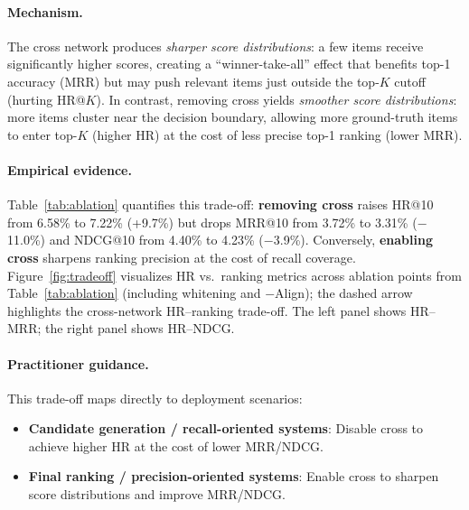 \documentclass[sigconf,natbib=true,anonymous]{acmart}
\begin{document}
\paragraph{Mechanism.}
The cross network produces \emph{sharper score distributions}:
a few items receive significantly higher scores, creating a
``winner-take-all'' effect that benefits top-1 accuracy (MRR)
but may push relevant items just outside the top-$K$ cutoff (hurting HR@$K$).
In contrast, removing cross yields \emph{smoother score distributions}:
more items cluster near the decision boundary,
allowing more ground-truth items to enter top-$K$ (higher HR)
at the cost of less precise top-1 ranking (lower MRR).

\paragraph{Empirical evidence.}
Table~\ref{tab:ablation} quantifies this trade-off:
\textbf{removing cross} raises HR@10 from 6.58\% to 7.22\% (+9.7\%)
but drops MRR@10 from 3.72\% to 3.31\% ($-$11.0\%) and NDCG@10
from 4.40\% to 4.23\% ($-$3.9\%).
Conversely, \textbf{enabling cross} sharpens ranking precision
at the cost of recall coverage.
Figure~\ref{fig:tradeoff} visualizes HR vs.\ ranking metrics across
ablation points from Table~\ref{tab:ablation} (including whitening
and $-$Align); the dashed arrow highlights the cross-network
HR--ranking trade-off. The left panel shows HR--MRR; the right
panel shows HR--NDCG.

\paragraph{Practitioner guidance.}
This trade-off maps directly to deployment scenarios:
\begin{itemize}[leftmargin=*,itemsep=2pt]
  \item \textbf{Candidate generation / recall-oriented systems}:
    Disable cross to achieve higher HR at the cost of lower MRR/NDCG.
  \item \textbf{Final ranking / precision-oriented systems}:
    Enable cross to sharpen score distributions and improve MRR/NDCG.
\end{itemize}
\end{document}

